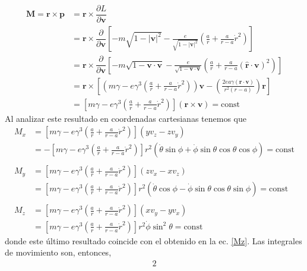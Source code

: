 \documentclass[]{article}
\numberwithin{equation}{section}
\newcommand{\0}{\textcolor{gray}{0}}
\newcommand{\rv}{\mathbf{r}}
\newcommand{\rhat}{\hat{\rv}}
\newcommand{\pd}[2]{\dfrac{\partial #1}{\partial #2}}
\newcommand{\n}[1]{\mathbf{#1}}
\begin{document}
\begin{enumerate}
\begin{enumerate}
		\begin{align}
			\n{M} = \n{r} \times \n{p} &= \n{r} \times \pd{L}{\n{v}}\nonumber\\
			&= \rv \times \pd{}{\n{v}} \left[ - m \sqrt{1 - |\n{v}|^2} - \frac{e}{\sqrt{1 - |\n{v}|^2}} \left(\frac{a}{r} + \frac{a}{r - a}\dot{r}^2\right) \right]\nonumber\\
			&= \rv \times \pd{}{\n{v}} \left[ - m \sqrt{1 - \n{v}\cdot\n{v}} - \frac{e}{\sqrt{1 - \n{v}\cdot\n{v}}} \left(\frac{a}{r} + \frac{a}{r - a}(\rhat\cdot\n{v})^2\right) \right]\nonumber\\
			&= \rv \times  \left[ \left( m\gamma - e\gamma^3 \left(\frac{a}{r} + \frac{a}{r - a}\dot{r}^2\right) \right) \n{v} - \left( \frac{2ea\gamma(\rv\cdot\n{v})}{r^2(r-a)} \right) \rv \right]\nonumber\\
			&= \left[ m\gamma - e\gamma^3 \left(\frac{a}{r} + \frac{a}{r - a}\dot{r}^2\right) \right] (\rv \times \n{v}) = \mathrm{const}
		\end{align}
		Al analizar este resultado en coordenadas cartesianas tenemos que
		\begin{align}
			M_x &= \left[ m\gamma - e\gamma^3 \left(\frac{a}{r} + \frac{a}{r - a}\dot{r}^2\right) \right] \left(y v_z - z v_y\right)\nonumber\\
			&= -\left[ m\gamma - e\gamma^3 \left(\frac{a}{r} + \frac{a}{r - a}\dot{r}^2\right) \right] r^2 \left( \dot{\theta}\sin\phi + \dot{\phi}\sin\theta\cos\theta\cos\phi \right) = \mathrm{const}\\ \nonumber\\
			M_y &= \left[ m\gamma - e\gamma^3 \left(\frac{a}{r} + \frac{a}{r - a}\dot{r}^2\right) \right] \left(zv_x - xv_z\right)\nonumber\\
			&= \left[ m\gamma - e\gamma^3 \left(\frac{a}{r} + \frac{a}{r - a}\dot{r}^2\right) \right] r^2 \left( \dot{\theta}\cos\phi - \dot{\phi}\sin\theta\cos\theta\sin\phi \right) = \mathrm{const}\\ \nonumber\\
			M_z &= \left[ m\gamma - e\gamma^3 \left(\frac{a}{r} + \frac{a}{r - a}\dot{r}^2\right) \right] \left(xv_y - yv_x\right)\nonumber\\
			&= \left[ m\gamma - e\gamma^3 \left(\frac{a}{r} + \frac{a}{r - a}\dot{r}^2\right) \right] r^2 \dot{\phi} \sin^2\theta = \mathrm{const}\nonumber
		\end{align}
		donde este último resultado coincide con el obtenido en la ec. \ref{Mz}. Las integrales de movimiento son, entonces,
		\begin{alignat*}{2}

\end{alignat*}
\end{enumerate}
\end{enumerate}
\end{document}
